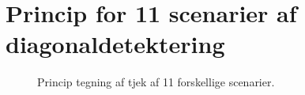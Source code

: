 \section{Princip for 11 scenarier af diagonaldetektering}
\label{app:firkant}

\begin{figure}[!th]
\centering
\begin{tikzpicture}[scale=0.95]

\end{tikzpicture}
\caption[tekst i indholdsfortegnelsen]{Princip tegning af tjek af 11 forskellige scenarier.}
\label{fig:principotte}
\end{figure}
\newpage

